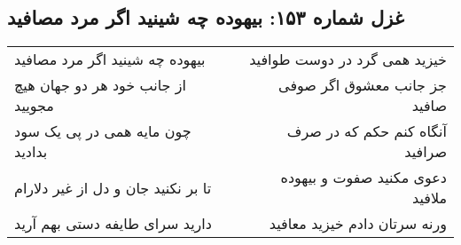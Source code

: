 \begin{center}
\section*{غزل شماره ۱۵۳: بیهوده چه شینید اگر مرد مصافید}
\label{sec:153}
\begin{longtable}{l p{0.5cm} r}
بیهوده چه شینید اگر مرد مصافید
&&
خیزید همی گرد در دوست طوافید
\\
از جانب خود هر دو جهان هیچ مجویید
&&
جز جانب معشوق اگر صوفی صافید
\\
چون مایه همی در پی یک سود بدادید
&&
آنگاه کنم حکم که در صرف صرافید
\\
تا بر نکنید جان و دل از غیر دلارام
&&
دعوی مکنید صفوت و بیهوده ملافید
\\
دارید سرای طایفه دستی بهم آرید
&&
ورنه سرتان دادم خیزید معافید
\\
\end{longtable}
\end{center}
